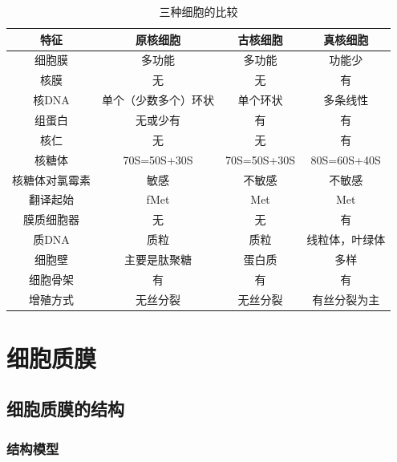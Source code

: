 \begin{table}[htbp]
\centering
\begin{tabularx}{\textwidth}{|C|c|c|c|}
	\hline
	\textbf{特征} & \textbf{原核细胞} & \textbf{古核细胞} & \textbf{真核细胞} \\ \hline
	细胞膜 & 多功能 & 多功能 & 功能少 \\ \hline
	核膜 & 无 & 无 & 有 \\ \hline
	核DNA & 单个（少数多个）环状 & 单个环状 & 多条线性 \\ \hline
	组蛋白 & 无或少有 & 有 & 有 \\ \hline
	核仁 & 无 & 无 & 有 \\ \hline
	核糖体 & 70S=50S+30S & 70S=50S+30S\footnotemark & 80S=60S+40S \\ \hline
	核糖体对氯霉素 & 敏感 & 不敏感 & 不敏感 \\ \hline
	翻译起始 & fMet & Met & Met \\ \hline
	膜质细胞器 & 无 & 无 & 有 \\ \hline
	质DNA & 质粒 & 质粒 & 线粒体，叶绿体 \\ \hline
	细胞壁 & 主要是肽聚糖 & 蛋白质 & 多样 \\ \hline
	细胞骨架 & 有 & 有 & 有 \\ \hline
	增殖方式 & 无丝分裂 & 无丝分裂 & 有丝分裂为主 \\ \hline
\end{tabularx}
\caption{三种细胞的比较}
\label{tab:三种细胞的比较}
\end{table}

\section{细胞质膜}

\subsection{细胞质膜的结构}

\subsubsection{结构模型}

